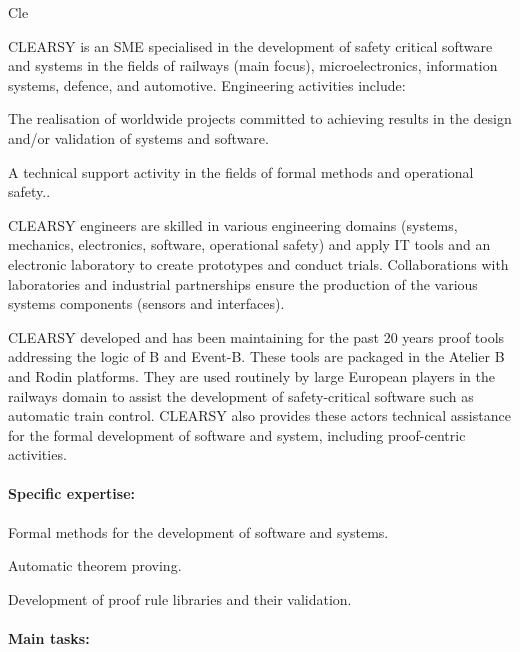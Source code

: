 \begin{sitedescription}{Cle}


CLEARSY is an SME specialised in the development of safety critical software and systems in the fields
of railways (main focus), microelectronics, information systems, defence, and automotive. Engineering 
activities include:
\begin{compactitem}
\item The realisation of worldwide projects committed to achieving results in the design and/or validation of systems and software.
\item A technical support activity in the fields of formal methods and operational safety..
\end{compactitem}

CLEARSY engineers are skilled in various engineering domains (systems, mechanics, electronics, software,
operational safety) and apply IT tools and an electronic laboratory to create prototypes and
conduct trials. Collaborations with laboratories and industrial partnerships ensure the production of
the various systems components (sensors and interfaces).

CLEARSY developed and has been maintaining for the past 20 years proof tools addressing the logic of B and Event-B. These tools are 
packaged in the Atelier B and Rodin platforms. They are used routinely by large European players in the railways domain to assist the
development of safety-critical software such as automatic train control. CLEARSY also provides these actors technical assistance for the formal development of software and system, including proof-centric activities. 

\paragraph*{Specific expertise:}

\begin{compactitem}
\item Formal methods for the development of software and systems.
\item Automatic theorem proving.
\item Development of proof rule libraries and their validation.
\end{compactitem}

\paragraph*{Main tasks:}


\end{sitedescription}
